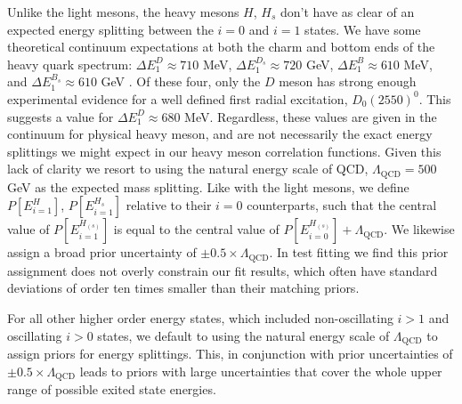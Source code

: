 Unlike the light mesons, the heavy mesons $H$, $H_s$ don't have as clear of an expected energy splitting between the $i=0$ and $i=1$ states.  We have some theoretical continuum expectations at both the charm and bottom ends of the heavy quark spectrum: $\Delta E^D_{1} \approx 710$ MeV, $\Delta E^{D_s}_1 \approx 720$ GeV, $\Delta E^B_{1} \approx 610$ MeV, and $\Delta E^{B_s}_1 \approx 610$ GeV \cite{Ebert:2009ua}.  Of these four, only the $D$ meson has strong enough experimental evidence for a well defined first radial excitation, $D_0(2550)^0$.  This suggests a value for $\Delta E^D_{1} \approx 680$ MeV.  Regardless, these values are given in the continuum for physical heavy meson, and are not necessarily the exact energy splittings we might expect in our heavy meson correlation functions.  Given this lack of clarity we resort to using the natural energy scale of QCD, $\Lambda_\text{QCD} = 500$ GeV as the expected mass splitting.  Like with the light mesons, we define $P[E^H_{i=1}]$, $P[E^{H_s}_{i=1}]$ relative to their $i=0$ counterparts, such that the central value of $P[E^{H_{(s)}}_{i=1}]$ is equal to the central value of $P[E^{H_{(s)}}_{i=0}] + \Lambda_\mathrm{QCD}$.  We likewise assign a broad prior uncertainty of $\pm0.5 \times\Lambda_\mathrm{QCD}$.  In test fitting we find this prior assignment does not overly constrain our fit results, which often have standard deviations of order ten times smaller than their matching priors.

For all other higher order energy states, which included non-oscillating $i>1$ and oscillating $i>0$ states, we default to using the natural energy scale of $\Lambda_\mathrm{QCD}$ to assign priors for energy splittings.  This, in conjunction with prior uncertainties of $\pm0.5 \times\Lambda_\mathrm{QCD}$ leads to priors with large uncertainties that cover the whole upper range of possible exited state energies. 


